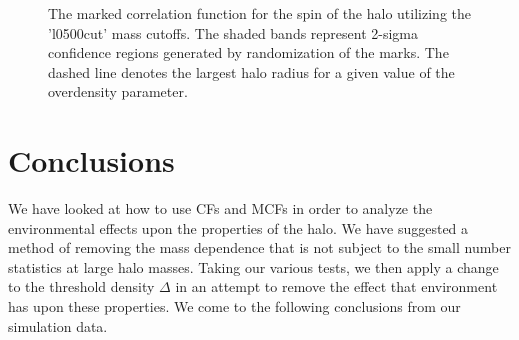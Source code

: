 \documentclass[usenatbib,usegraphicx,letterpaper]{mn2e}
\begin{document}
\begin{figure}
	\centering
	\caption{The marked correlation function for the spin of the halo utilizing the 'l0500cut' mass cutoffs. The shaded bands represent 2-sigma confidence regions generated by randomization of the marks. The dashed line denotes the largest halo radius for a given value of the overdensity parameter.}
\end{figure}

\section[]{Conclusions}
\label{section:conclusions}

We have looked at how to use CFs and MCFs in order to analyze the environmental effects upon the properties of the halo. We have suggested a method of removing the mass dependence that is not subject to the small number statistics at large halo masses. Taking our various tests, we then apply a change to the threshold density $\Delta$ in an attempt to remove the effect that environment has upon these properties. We come to the following conclusions from our simulation data.
\end{document}
